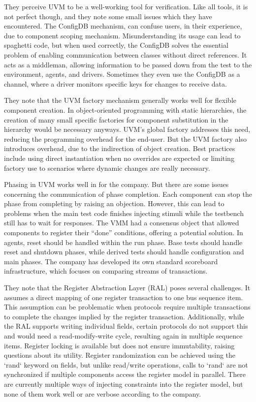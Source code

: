 \documentclass[12pt]{book}
\begin{document}
They perceive UVM to be a well-working tool for verification. Like all tools, it is not perfect though, and they note
some small issues which they have encountered. The ConfigDB mechanism, can confuse users, in their experience, due to
component scoping mechanism. Misunderstanding its usage can lead to spaghetti code, but when used correctly, the
ConfigDB solves the essential problem of enabling communication between classes without direct references. It acts as
a middleman, allowing information to be passed down from the test to the environment, agents, and drivers. Sometimes
they even use the ConfigDB as a channel, where a driver monitors specific keys for changes to receive data.

They note that the UVM factory mechanism generally works well for flexible component creation. In object-oriented
programming with static hierarchies, the creation of many small specific factories for component substitution in the
hierarchy would be necessary anyways. UVM's global factory addresses this need, reducing the programming overhead for
the end-user. But the UVM factory also introduces overhead, due to the indirection of object creation. Best practices
include using direct instantiation when no overrides are expected or limiting factory use to scenarios where dynamic
changes are really necessary.

Phasing in UVM works well in for the company. But there are some issues concerning the communication of phase
completion. Each component can stop the phase from completing by raising an objection. However, this can lead to
problems when the main test code finishes injecting stimuli while the testbench still has to wait for responses. The
VMM had a consensus object that allowed components to register their “done” conditions, offering a potential
solution. In agents, reset should be handled within the run phase. Base tests should handle reset and shutdown
phases, while derived tests should handle configuration and main phases. The company has developed its own standard
scoreboard infrastructure, which focuses on comparing streams of transactions.

They note that the Register Abstraction Layer (RAL) poses several challenges. It assumes a direct mapping of one
register transaction to one bus sequence item. This assumption can be problematic when protocols require multiple
transactions to complete the changes implied by the register transaction. Additionally, while the RAL supports
writing individual fields, certain protocols do not support this and would need a read-modify-write cycle, resulting
again in multiple sequence items. Register locking is available but does not ensure immutability, raising questions
about its utility. Register randomization can be achieved using the `rand` keyword on fields, but unlike read/write
operations, calls to `rand` are not synchronized if multiple components access the register model in parallel. There
are currently multiple ways of injecting constraints into the register model, but none of them work well or are
verbose according to the company.
\end{document}
